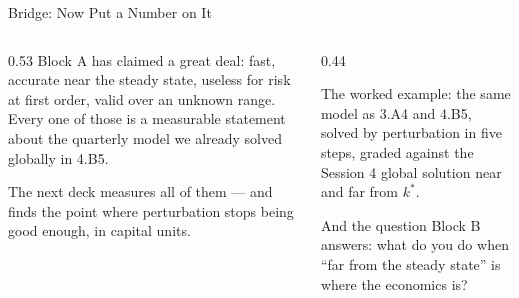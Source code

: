 \begin{frame}{Bridge: Now Put a Number on It}
\begin{columns}[T]
\begin{column}{0.53\textwidth}
\small
Block A has claimed a great deal: fast, accurate near the steady state, useless for risk at first order, valid over an unknown range. Every one of those is a measurable statement about the quarterly model we already solved globally in 4.B5.
\medskip

The next deck measures all of them --- and finds the point where perturbation stops being good enough, in capital units.
\end{column}
\begin{column}{0.44\textwidth}
\begin{conceptbox}[title=\textbf{Next (5.A6)}]\small
The worked example: the same model as 3.A4 and 4.B5, solved by perturbation in five steps, graded against the Session 4 global solution near and far from $k^{*}$.
\end{conceptbox}
\medskip
\begin{examplebox}\footnotesize
And the question Block B answers: what do you do when ``far from the steady state'' is where the economics is?
\end{examplebox}
\end{column}
\end{columns}
\end{frame}


